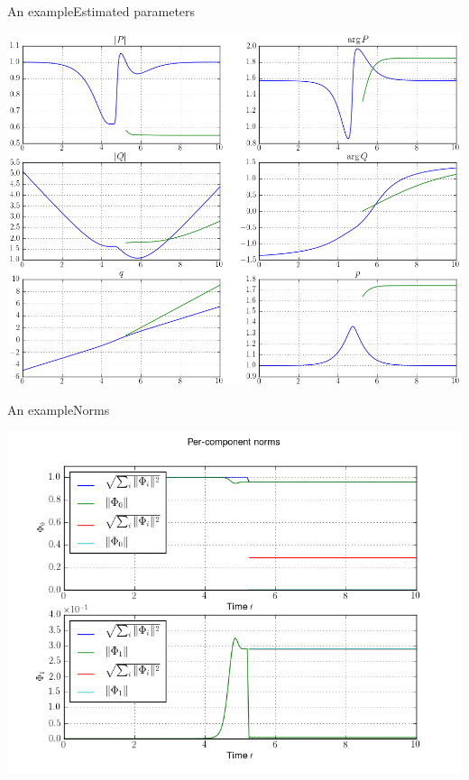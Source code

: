 \documentclass{beamer}
\begin{document}
\begin{frame}{An example}{Estimated parameters}
  \begin{center}
    \includegraphics[scale=0.35]{./fig/wavepacket_parameters_estimation.png}
  \end{center}
\end{frame}


\begin{frame}{An example}{Norms}
  \begin{center}
    \includegraphics[scale=0.4]{./fig/norms_components_spawned.png}
  \end{center}
\end{frame}
\end{document}
